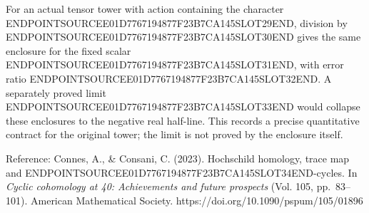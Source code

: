 For an actual tensor tower with action containing the character ENDPOINTSOURCEE01D7767194877F23B7CA145SLOT29END, division by ENDPOINTSOURCEE01D7767194877F23B7CA145SLOT30END gives the same enclosure for the fixed scalar ENDPOINTSOURCEE01D7767194877F23B7CA145SLOT31END, with error ratio ENDPOINTSOURCEE01D7767194877F23B7CA145SLOT32END. A separately proved limit ENDPOINTSOURCEE01D7767194877F23B7CA145SLOT33END would collapse these enclosures to the negative real half-line. This records a precise quantitative contract for the original tower; the limit is not proved by the enclosure itself.

Reference: Connes, A., \& Consani, C. (2023). Hochschild homology, trace map and ENDPOINTSOURCEE01D7767194877F23B7CA145SLOT34END-cycles. In \emph{Cyclic cohomology at 40: Achievements and future prospects} (Vol. 105, pp.~83--101). American Mathematical Society. https://doi.org/10.1090/pspum/105/01896
